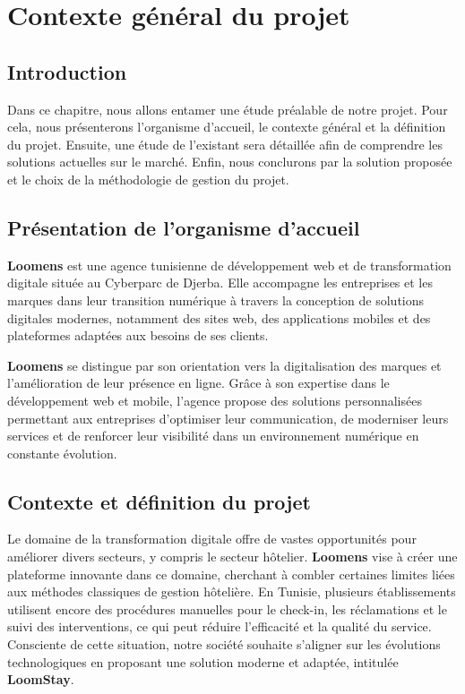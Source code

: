 \chapter{Contexte général du projet}
\label{chap:contexte}

\section*{Introduction}
Dans ce chapitre, nous allons entamer une étude préalable de notre projet. Pour cela, nous présenterons l'organisme d'accueil, le contexte général et la définition du projet. Ensuite, une étude de l'existant sera détaillée afin de comprendre les solutions actuelles sur le marché. Enfin, nous conclurons par la solution proposée et le choix de la méthodologie de gestion du projet.

\section{Présentation de l'organisme d'accueil}
\textbf{Loomens} est une agence tunisienne de développement web et de transformation digitale située au Cyberparc de Djerba. Elle accompagne les entreprises et les marques dans leur transition numérique à travers la conception de solutions digitales modernes, notamment des sites web, des applications mobiles et des plateformes adaptées aux besoins de ses clients.

\textbf{Loomens} se distingue par son orientation vers la digitalisation des marques et l'amélioration de leur présence en ligne. Grâce à son expertise dans le développement web et mobile, l'agence propose des solutions personnalisées permettant aux entreprises d'optimiser leur communication, de moderniser leurs services et de renforcer leur visibilité dans un environnement numérique en constante évolution.


\section{Contexte et définition du projet}
Le domaine de la transformation digitale offre de vastes opportunités pour améliorer divers secteurs, y compris le secteur hôtelier. \textbf{Loomens} vise à créer une plateforme innovante dans ce domaine, cherchant à combler certaines limites liées aux méthodes classiques de gestion hôtelière. En Tunisie, plusieurs établissements utilisent encore des procédures manuelles pour le check-in, les réclamations et le suivi des interventions, ce qui peut réduire l'efficacité et la qualité du service. Consciente de cette situation, notre société souhaite s'aligner sur les évolutions technologiques en proposant une solution moderne et adaptée, intitulée \textbf{LoomStay}.

